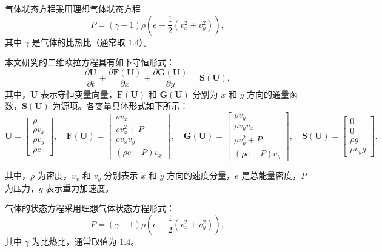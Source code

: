 \documentclass{article}
\numberwithin{equation}{section}    %
\begin{document}
气体状态方程采用理想气体状态方程
\begin{equation}
    P = (\gamma - 1)\rho \left( e - \frac{1}{2}(v_x^2 + v_y^2) \right),
\end{equation}
其中 $\gamma$ 是气体的比热比（通常取 $1.4$）。



本文研究的二维欧拉方程具有如下守恒形式：
\begin{equation}
    \frac{\partial \mathbf{U}}{\partial t}
    + \frac{\partial \mathbf{F}(\mathbf{U})}{\partial x}
    + \frac{\partial \mathbf{G}(\mathbf{U})}{\partial y}
    = \mathbf{S}(\mathbf{U}),
\end{equation}
其中，$\mathbf{U}$ 表示守恒变量向量，$\mathbf{F}(\mathbf{U})$ 和 $\mathbf{G}(\mathbf{U})$ 分别为 $x$ 和 $y$ 方向的通量函数，$\mathbf{S}(\mathbf{U})$ 为源项。各变量具体形式如下所示：
\begin{equation}
\mathbf{U} = \begin{bmatrix}
\rho       \\
\rho v_{x} \\
\rho v_{y} \\
\rho e
\end{bmatrix}, \quad
\mathbf{F}(\mathbf{U}) = \begin{bmatrix}
\rho v_{x}       \\
\rho v_{x}^{2}+P \\
\rho v_{x} v_{y} \\
(\rho e+P) v_{x}
\end{bmatrix}, \quad
\mathbf{G}(\mathbf{U}) = \begin{bmatrix}
\rho v_{y}       \\
\rho v_{y} v_{x} \\
\rho v_{y}^{2}+P \\
(\rho e+P) v_{y}
\end{bmatrix}, \quad
\mathbf{S}(\mathbf{U}) = \begin{bmatrix}
0      \\
0      \\
\rho g \\
\rho v_{y} g
\end{bmatrix}.
\end{equation}

其中，$\rho$ 为密度，$v_x$ 和 $v_y$ 分别表示 $x$ 和 $y$ 方向的速度分量，$e$ 是总能量密度，$P$ 为压力，$g$ 表示重力加速度。

气体的状态方程采用理想气体状态方程形式：
\begin{equation}
    P = (\gamma - 1)\rho \left( e - \frac{1}{2}(v_x^2 + v_y^2) \right),
\end{equation}
其中 $\gamma$ 为比热比，通常取值为 $1.4$。
\end{document}
